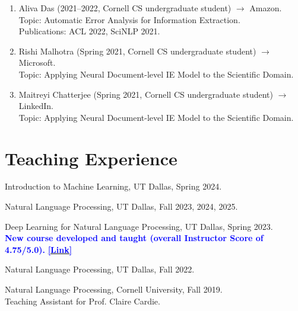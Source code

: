 \begin{enumerate}[label={},leftmargin=15pt]
\vspace{1mm}
\item Aliva Das (2021--2022, Cornell CS undergraduate student) $\rightarrow$ Amazon. \\
Topic: Automatic Error Analysis for Information Extraction. \\
Publications: ACL 2022, SciNLP 2021. 

\vspace{1mm}
\item Rishi Malhotra (Spring 2021, Cornell CS undergraduate student) $\rightarrow$ Microsoft. \\
Topic: Applying Neural Document-level IE Model to the Scientific Domain.

\vspace{1mm}
\item Maitreyi Chatterjee (Spring 2021, Cornell CS undergraduate student) $\rightarrow$ LinkedIn. \\
Topic: Applying Neural Document-level IE Model to the Scientific Domain.  \\



    
\end{enumerate}

















\section{Teaching Experience}

\noindent Introduction to Machine Learning, UT Dallas, Spring 2024.

\noindent Natural Language Processing, UT Dallas, Fall 2023, 2024, 2025.

\noindent Deep Learning for Natural Language Processing, UT Dallas, Spring 2023. \\
\textbf{\textcolor{blue}{New course developed and taught (overall Instructor Score of 4.75/5.0).}}
{\bf \href{https://xinyadu.github.io/cs6301/index.html}{\textcolor{blue}{[Link]}}}

\noindent Natural Language Processing, UT Dallas, Fall 2022. 

\noindent Natural Language Processing, Cornell University, Fall 2019. \\
\indent Teaching Assistant for Prof. Claire Cardie.

